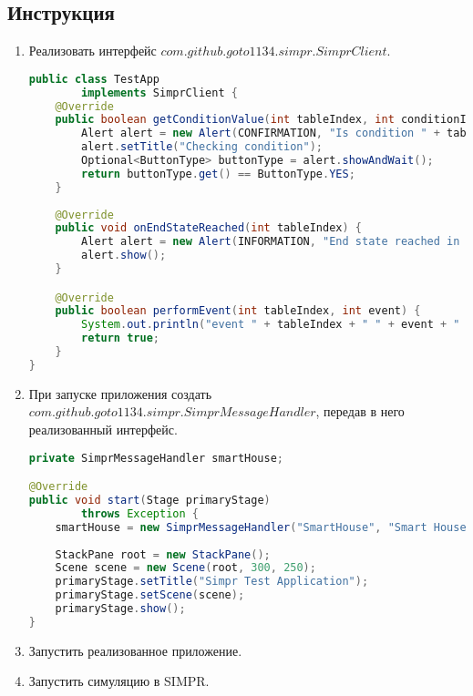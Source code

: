 	 	\subsection{Инструкция}
	 		\begin{enumerate}
	 			\item Реализовать интерфейс $ com.github.goto1134.simpr.SimprClient $.
	 				\begin{ListingEnv}[!h]%
	 					\caption{Пример реализации интерфейса SimprClient}
	 					\label{list:client}
	 					\begin{lstlisting}[language={Java}]
public class TestApp
		implements SimprClient {
	@Override
	public boolean getConditionValue(int tableIndex, int conditionIndex) {
		Alert alert = new Alert(CONFIRMATION, "Is condition " + tableIndex + " " + conditionIndex + " true?", ButtonType.YES, ButtonType.NO);
		alert.setTitle("Checking condition");
		Optional<ButtonType> buttonType = alert.showAndWait();
		return buttonType.get() == ButtonType.YES;
	}
	
	@Override
	public void onEndStateReached(int tableIndex) {
		Alert alert = new Alert(INFORMATION, "End state reached in table " + tableIndex);
		alert.show();
	}

	@Override
	public boolean performEvent(int tableIndex, int event) {
		System.out.println("event " + tableIndex + " " + event + " occured");
		return true;
	}
}
	 					\end{lstlisting}
	 				\end{ListingEnv}%
	 			\item При запуске приложения создать $ com.github.goto1134.simpr.SimprMessageHandler $, передав в него реализованный интерфейс.
	 			\begin{ListingEnv}[!h]%
	 				\caption{Пример кода, запускающего приложение}
	 				\label{list:handler}
	 				\begin{lstlisting}[language={Java}]
private SimprMessageHandler smartHouse;

@Override
public void start(Stage primaryStage)
		throws Exception {
	smartHouse = new SimprMessageHandler("SmartHouse", "Smart House Simulator", this);
	
	StackPane root = new StackPane();
	Scene scene = new Scene(root, 300, 250);
	primaryStage.setTitle("Simpr Test Application");
	primaryStage.setScene(scene);
	primaryStage.show();
}
	 				\end{lstlisting}
	 			\end{ListingEnv}%
 				\FloatBarrier
 				\item Запустить реализованное приложение.
 				\item Запустить симуляцию в SIMPR.	
 			\end{enumerate}
 		
